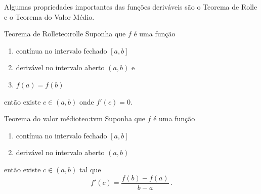 Algumas propriedades importantes das funções deriváveis são o
Teorema de Rolle e o Teorema do Valor Médio.

\begin{teorema}{Teorema de Rolle}{teo:rolle}
  Suponha
  que $f$ é uma função
  \begin{enumerate}
    \item contínua  no intervalo fechado $[a, b]$
    \item derivável no intervalo aberto  $(a, b)$ e
    \item \(f(a)=f(b)\)
  \end{enumerate}
  então existe $c\in(a, b)$ onde $f'(c)=0$.
\end{teorema}

\begin{teorema}{Teorema do valor médio}{teo:tvm}
  Suponha
  que $f$ é uma função
  \begin{enumerate}
    \item contínua  no intervalo fechado $[a, b]$
    \item derivável no intervalo aberto  $(a, b)$
  \end{enumerate}
  então existe $c\in(a, b)$ tal que
  \[
    f'(c) = \frac{f(b)-f(a)}{b-a} \,.
  \]
\end{teorema}
